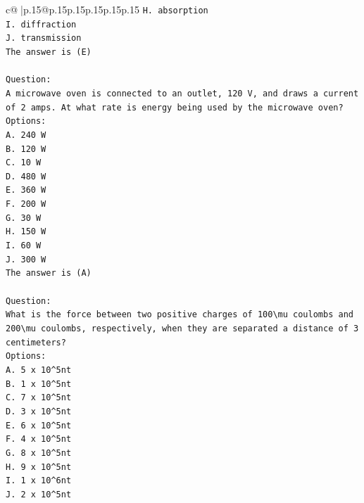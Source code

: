 \documentclass{article}
\begin{document}
{\begin{supertabular}{c@{$\;$}|p{.15\linewidth}@{}p{.15\linewidth}p{.15\linewidth}p{.15\linewidth}p{.15\linewidth}p{.15\linewidth}}
{{{\texttt{H. absorption} \\
\texttt{I. diffraction} \\
\texttt{J. transmission} \\
\texttt{The answer is (E)} \\
\\ 
\texttt{Question:} \\
\texttt{A microwave oven is connected to an outlet, 120 V, and draws a current of 2 amps. At what rate is energy being used by the microwave oven?} \\
\texttt{Options:} \\
\texttt{A. 240 W} \\
\texttt{B. 120 W} \\
\texttt{C. 10 W} \\
\texttt{D. 480 W} \\
\texttt{E. 360 W} \\
\texttt{F. 200 W} \\
\texttt{G. 30 W} \\
\texttt{H. 150 W} \\
\texttt{I. 60 W} \\
\texttt{J. 300 W} \\
\texttt{The answer is (A)} \\
\\ 
\texttt{Question:} \\
\texttt{What is the force between two positive charges of 100\textbackslash{}mu coulombs and 200\textbackslash{}mu coulombs, respectively, when they are separated a distance of 3 centimeters?} \\
\texttt{Options:} \\
\texttt{A. 5 x 10\^{}5nt} \\
\texttt{B. 1 x 10\^{}5nt} \\
\texttt{C. 7 x 10\^{}5nt} \\
\texttt{D. 3 x 10\^{}5nt} \\
\texttt{E. 6 x 10\^{}5nt} \\
\texttt{F. 4 x 10\^{}5nt} \\
\texttt{G. 8 x 10\^{}5nt} \\
\texttt{H. 9 x 10\^{}5nt} \\
\texttt{I. 1 x 10\^{}6nt} \\
\texttt{J. 2 x 10\^{}5nt} \\
            }
        }
    }
     \\ \\


\end{supertabular}}
\end{document}
